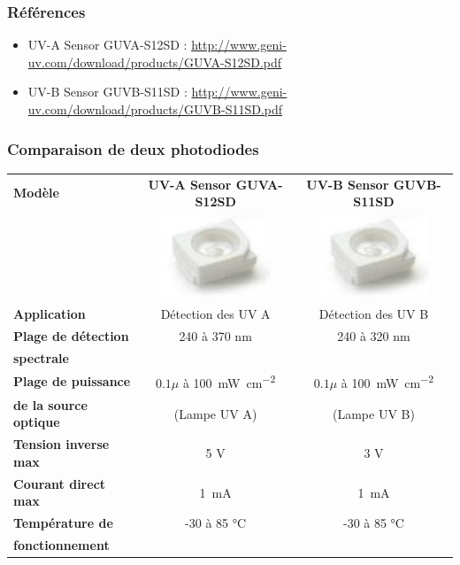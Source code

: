 \documentclass{article}
\begin{document}
    \subsubsection{Références}
    \begin{itemize}
        \item UV-A Sensor GUVA-S12SD : \url{http://www.geni-uv.com/download/products/GUVA-S12SD.pdf}
        \item UV-B Sensor GUVB-S11SD : \url{http://www.geni-uv.com/download/products/GUVB-S11SD.pdf}
    \end{itemize}

    \subsubsection{Comparaison de deux photodiodes}
    \begin{table}[H]
        \centering
        \begin{tabular}{l|c|c}
        \textbf{Modèle}
            & \textbf{UV-A Sensor GUVA-S12SD}
            & \textbf{UV-B Sensor GUVB-S11SD}\\
            & \includegraphics[width=0.1\linewidth]{./images/photodiode-UVA.png}
            & \includegraphics[width=0.1\linewidth]{./images/photodiode-UVA.png}\\
        \hline
        \textbf{Application}            & Détection des UV A            & Détection des UV B            \\
        \hline
        \textbf{Plage de détection}     & 240 à 370 \si{\nano\meter}    & 240 à 320 \si{\nano\meter}    \\
        \textbf{spectrale}              & & \\
        \hline
        \textbf{Plage de puissance}     & $0.1 \mu$ à \SI{100}{\milli\watt\per\square\centi\meter}& $0.1 \mu$ à \SI{100}{\milli\watt\per\square\centi\meter}\\
        \textbf{de la source optique}   & (Lampe UV A)                  & (Lampe UV B)                  \\
        \hline
        \textbf{Tension inverse max}    & 5 V                           & 3 V                           \\
        \hline
        \textbf{Courant direct max}     & \SI{1}{\milli\ampere}         & \SI{1}{\milli\ampere}         \\
        \hline
        \textbf{Température de}         & -30 à 85 \si{\celsius}        & -30 à 85 \si{\celsius}        \\
        \textbf{fonctionnement}         & & \\
    \end{tabular}
    \end{table}
\end{document}
